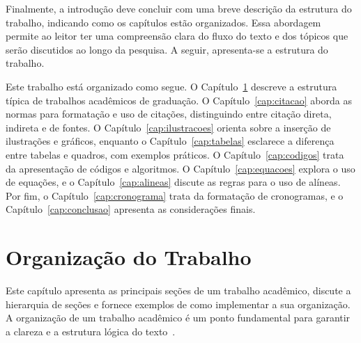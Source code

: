 \documentclass[
    12pt
    ,oneside
    ,a4paper
    ,chapter=TITLE
    ,section=TITLE
    ,sumario=abnt-6027-2012]{abntex2}
\begin{document}
Finalmente, a introdução deve concluir com uma breve descrição da estrutura do trabalho, indicando como os capítulos estão organizados. Essa abordagem permite ao leitor ter uma compreensão clara do fluxo do texto e dos tópicos que serão discutidos ao longo da pesquisa. A seguir, apresenta-se a estrutura do trabalho.

Este trabalho está organizado como segue. 
O Capítulo~\ref{cap:organizacao} descreve a estrutura típica de trabalhos acadêmicos de graduação. 
O Capítulo~\ref{cap:citacao} aborda as normas para formatação e uso de citações, distinguindo entre citação direta, indireta e de fontes. 
O Capítulo~\ref{cap:ilustracoes} orienta sobre a inserção de ilustrações e gráficos, enquanto o Capítulo~\ref{cap:tabelas} esclarece a diferença entre tabelas e quadros, com exemplos práticos. 
O Capítulo~\ref{cap:codigos} trata da apresentação de códigos e algoritmos.
O Capítulo~\ref{cap:equacoes} explora o uso de equações, e o Capítulo~\ref{cap:alineas} discute as regras para o uso de alíneas. 
Por fim, o Capítulo~\ref{cap:cronograma} trata da formatação de cronogramas, e o Capítulo~\ref{cap:conclusao} apresenta as considerações finais.





\chapter{Organização do Trabalho}
\label{cap:organizacao}

Este capítulo apresenta as principais seções de um trabalho acadêmico, discute a hierarquia de seções  e fornece exemplos de como implementar a sua organização. A organização de um trabalho acadêmico é um ponto fundamental para garantir a clareza e a estrutura lógica do texto~\cite{severino}.
\end{document}
